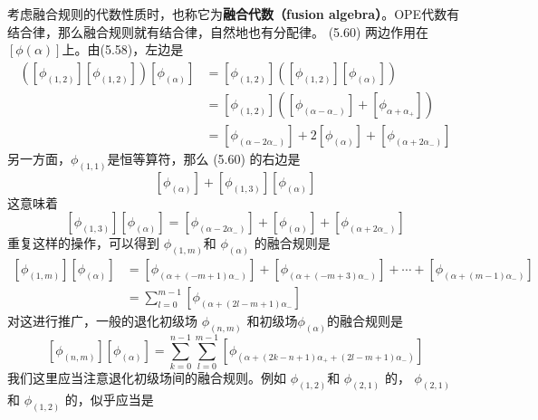 考虑融合规则的代数性质时，也称它为\textbf{融合代数（fusion algebra）}。OPE代数有结合律，那么融合规则就有结合律，自然地也有分配律。 (5.60) 两边作用在 $[\phi(\alpha)] $上。由(5.58)，左边是
\begin{equation}
	\begin{aligned} \left(\left[\phi_{(1,2)}\right]\left[\phi_{(1,2)}\right]\right)\left[\phi_{(\alpha)}\right] &=\left[\phi_{(1,2)}\right]\left(\left[\phi_{(1,2)}\right]\left[\phi_{(\alpha)}\right]\right) \\ &=\left[\phi_{(1,2)}\right]\left(\left[\phi_{\left(\alpha-\alpha_{-}\right)}\right]+\left[\phi_{\alpha+\alpha_{+}}\right]\right) \\ &=\left[\phi_{\left(\alpha-2 \alpha_{-}\right)}\right]+2\left[\phi_{(\alpha)}\right]+\left[\phi_{\left(\alpha+2 \alpha_{-}\right)}\right] \end{aligned}
\end{equation}
另一方面，$ \phi_{(1,1)} $是恒等算符，那么 (5.60) 的右边是
\begin{equation}
	\left[\phi_{(\alpha)}\right]+\left[\phi_{(1,3)}\right]\left[\phi_{(\alpha)}\right]
\end{equation}
这意味着
\begin{equation}
	\left[\phi_{(1,3)}\right]\left[\phi_{(\alpha)}\right]=\left[\phi_{\left(\alpha-2 \alpha_{-}\right)}\right]+\left[\phi_{(\alpha)}\right]+\left[\phi_{\left(\alpha+2 \alpha_{-}\right)}\right]
\end{equation}
重复这样的操作，可以得到 $\phi_{(1, m)} $和 $\phi_{(\alpha)}$ 的融合规则是
\begin{equation}
	\begin{aligned} \left[\phi_{(1, m)}\right]\left[\phi_{(\alpha)}\right] &=\left[\phi_{\left(\alpha+(-m+1) \alpha_{-}\right)}\right]+\left[\phi_{\left(\alpha+(-m+3) \alpha_{-}\right)}\right]+\cdots+\left[\phi_{\left(\alpha+(m-1) \alpha_{-}\right)}\right] \\ &=\sum_{l=0}^{m-1}\left[\phi_{\left(\alpha+(2 l-m+1) \alpha_{-}\right.}\right] \end{aligned}
\end{equation}
对这进行推广，一般的退化初级场 $\phi_{(n, m)}$ 和初级场$ \phi_{(\alpha)} $的融合规则是
\begin{equation}
	\left[\phi_{(n, m)}\right]\left[\phi_{(\alpha)}\right]=\sum_{k=0}^{n-1} \sum_{l=0}^{m-1}\left[\phi_{\left(\alpha+(2 k-n+1) \alpha_{+}+(2 l-m+1) \alpha_{-}\right)}\right]
\end{equation}
我们这里应当注意退化初级场间的融合规则。例如 $\phi_{(1,2)} $和 $\phi_{(2,1)}$ 的， $\phi_{(2,1)} $和 $\phi_{(1,2)}$ 的，似乎应当是
